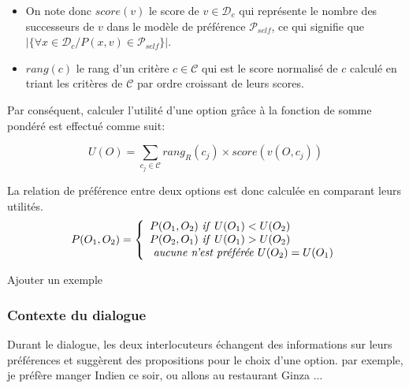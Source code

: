 \documentclass [french]{sig-alternate-05-2015}
\begin{document}
 \begin{itemize}
 	\item On note donc $score(v)$ le score de $v \in \mathcal{D}_{c}$ qui représente le nombre des successeurs de  $v$  dans le modèle de préférence $\mathcal{P}_{self}$, ce qui signifie que $|\{ \forall x \in \mathcal{D}_{c} / P (x,v) \in \mathcal{P}_{self}\}|$.
 	\item $rang(c)$ le rang d'un critère $c \in \mathcal{C}$ qui est le score normalisé de $c$ calculé en triant les critères de $\mathcal{C}$ par ordre croissant de leurs scores.
 \end{itemize}
Par conséquent, calculer l'utilité d'une option grâce à la fonction de somme pondéré est effectué comme suit:

\[U(O) = \sum_{c_j \in \mathcal{C}}  rang_R(c_j) \times score\left( v(O, c_j) \right) \] 


\par La relation de préférence entre deux options est donc calculée en comparant leurs utilités. 
\[ P(O_1, O_2)  = \left \{
\begin{array}{l}
P(O_1, O_2)$ \textit{if}  $U(O_1) < U(O_2) \\
P(O_2, O_1)$  \textit{if} $U(O_1) > U(O_2)  \\
$  \textit{aucune n'est préférée}  $U(O_2) = U(O_1)\\
\end{array}
\right .\]

{\color{red}
Ajouter un exemple }
\subsubsection{Contexte du dialogue}
\par Durant le dialogue, les deux interlocuteurs échangent des informations sur leurs préférences et suggèrent des propositions pour le choix d'une option. par exemple, je préfère manger Indien ce soir, ou allons au restaurant Ginza ...
\end{document}
